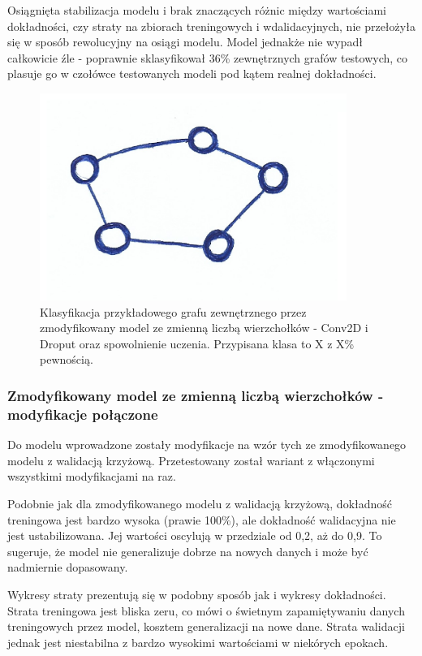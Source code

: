 Osiągnięta stabilizacja modelu i brak znaczących różnic między wartościami dokładności,
czy straty na zbiorach treningowych i wdalidacyjnych, nie przełożyła się w sposób rewolucyjny na osiągi modelu.
Model jednakże nie wypadł całkowicie źle - poprawnie sklasyfikował 36\% zewnętrznych grafów testowych,
co plasuje go w czołówce testowanych modeli pod kątem realnej dokładności.

\begin{figure}[ht]
	\centering
	\includegraphics[width=10cm]{../graph_classification/test_graphs/drawn/cycle-8.png}
	\caption{Klasyfikacja przykładowego grafu zewnętrznego przez zmodyfikowany model ze zmienną liczbą wierzchołków
		- Conv2D i Droput oraz spowolnienie uczenia.
		Przypisana klasa to X z X\% pewnością.}
	\label{Fig:tests-var-1d}
\end{figure}
\FloatBarrier

\subsubsection{Zmodyfikowany model ze zmienną liczbą wierzchołków - modyfikacje połączone}

Do modelu wprowadzone zostały modyfikacje na wzór tych ze zmodyfikowanego modelu z walidacją krzyżową.
Przetestowany został wariant z włączonymi wszystkimi modyfikacjami na raz.

Podobnie jak dla zmodyfikowanego modelu z walidacją krzyżową, dokładność treningowa jest bardzo wysoka (prawie 100\%),
ale dokładność walidacyjna nie jest ustabilizowana. Jej wartości oscylują w przedziale od 0,2, aż do 0,9.
To sugeruje, że model nie generalizuje dobrze na nowych danych i może być nadmiernie dopasowany.

Wykresy straty prezentują się w podobny sposób jak i wykresy dokładności.
Strata treningowa jest bliska zeru, co mówi o świetnym zapamiętywaniu danych treningowych przez model, kosztem generalizacji na nowe dane.
Strata walidacji jednak jest niestabilna z bardzo wysokimi wartościami w niekórych epokach.

